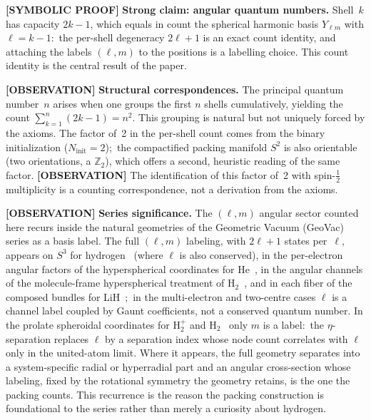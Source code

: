 \documentclass[aps,prl,reprint,amsmath,amssymb]{revtex4-2}
\begin{document}
\medskip

\textbf{[SYMBOLIC PROOF]} \noindent\textbf{Strong claim: angular quantum numbers.}  Shell~$k$
has capacity $2k - 1$, which equals in count the spherical harmonic
basis $Y_{\ell m}$ with $\ell = k - 1$:\ the per-shell degeneracy
$2\ell + 1$ is an exact count identity, and attaching the labels
$(\ell, m)$ to the positions is a labelling choice.  This count identity
is the central result of the paper.

\medskip

\textbf{[OBSERVATION]} \noindent\textbf{Structural correspondences.}  The principal quantum
number~$n$ arises when one groups the first $n$ shells cumulatively,
yielding the count $\sum_{k=1}^{n}(2k-1) = n^2$.  This grouping is
natural but not uniquely forced by the axioms.  The factor of~2 in the
per-shell count comes from the binary initialization
($N_{\mathrm{init}} = 2$);\ the compactified packing manifold $S^2$ is
also orientable (two orientations, a $\mathbb{Z}_2$), which offers a
second, heuristic reading of the same factor.  \textbf{[OBSERVATION]}
The identification of this factor of~2 with spin-$\tfrac{1}{2}$
multiplicity is a counting correspondence, not a derivation from the
axioms.

\medskip

\textbf{[OBSERVATION]} \noindent\textbf{Series significance.}  The $(\ell, m)$ angular
sector counted here recurs inside the natural geometries of the
Geometric Vacuum (GeoVac) series as a basis label.  The full $(\ell, m)$
labeling, with $2\ell+1$ states per~$\ell$, appears on $S^3$ for
hydrogen~\cite{paper7} (where $\ell$ is also conserved), in the
per-electron angular factors of the hyperspherical coordinates for
He~\cite{paper13}, in the angular channels of the molecule-frame
hyperspherical treatment of H$_2$~\cite{paper15}, and in each fiber of
the composed bundles for LiH~\cite{paper17};\ in the multi-electron and
two-centre cases $\ell$ is a channel label coupled by Gaunt coefficients,
not a conserved quantum number.  In the prolate spheroidal coordinates
for H$_2^+$ and H$_2$~\cite{paper11,paper12} only $m$ is a label:\ the
$\eta$-separation replaces $\ell$ by a separation index whose node count
correlates with $\ell$ only in the united-atom limit.  Where it
appears, the full geometry separates into a system-specific radial or
hyperradial part and an angular cross-section whose labeling, fixed by
the rotational symmetry the geometry retains, is the one the packing
counts.  This recurrence is the reason the packing
construction is foundational to the series rather than merely a
curiosity about hydrogen.
\end{document}
